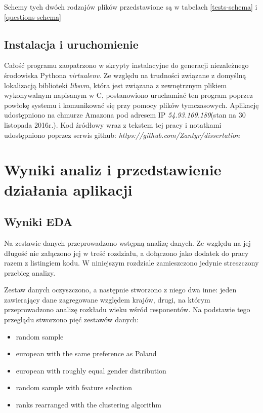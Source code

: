 \documentclass[12pt,a4paper,oneside]{report} %
\begin{document}
Schemy tych dwóch rodzajów plików przedstawione są w tabelach \ref{tests-schema} i \ref{questions-schema}

\section{Instalacja i uruchomienie}

Całość programu zaopatrzono w skrypty instalacyjne do generacji niezależnego środowiska Pythona \emph{virtualenv}. Ze względu na trudności związane z domyślną lokalizacją biblioteki \emph{libsvm}, która jest związana z zewnętrznym plikiem wykonywalnym napisanym w C, postanowiono uruchamiać ten program poprzez powłokę systemu i komunikować się przy pomocy plików tymczasowych. Aplikację udostępniono na chmurze Amazona pod adresem IP \emph{54.93.169.189}(stan na 30 listopada 2016r.). Kod źródłowy wraz z tekstem tej pracy i notatkami udostępniono poprzez serwis github: \emph{https://github.com/Zantyr/dissertation}\par

\chapter{Wyniki analiz i przedstawienie działania aplikacji}

\section{Wyniki EDA}

Na zestawie danych przeprowadzono wstępną analizę danych. Ze względu na jej długość nie załączono jej w treść rozdziału, a dołączono jako dodatek do pracy razem z listingiem kodu. W niniejszym rozdziale zamieszczono jedynie streszczony przebieg analizy. \par

Zestaw danych oczyszczono, a następnie stworzono z niego dwa inne: jeden zawierający dane zagregowane względem krajów, drugi, na którym przeprowadzono analizę rozkładu wieku wśród responentów.  Na podstawie tego przeglądu stworzono pięć zestawów danych: \par

\begin{itemize}
\item random sample
\item european with the same preference as Poland
\item european with roughly equal gender distribution
\item random sample with feature selection
\item ranks rearranged with the clustering algorithm
\end{itemize}
\end{document}
